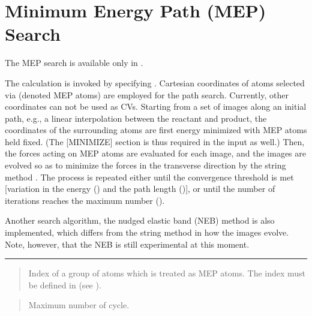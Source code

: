 \documentclass[a4paper,11pt,oneside,english]{sphinxmanual}
\begin{document}
\section{Minimum Energy Path (MEP) Search}
\label{\detokenize{15_RPath:minimum-energy-path-mep-search}}
The MEP search is available only in .

The calculation is invoked by specifying  .
Cartesian coordinates of atoms selected via 
(denoted MEP atoms)  are employed for the path search.
Currently, other coordinates can not be used as CVs.
Starting from a set of images along an initial path, e.g., a linear
interpolation between the reactant and product,
the coordinates of the surrounding atoms are first energy minimized
with MEP atoms held fixed. (The {[}MINIMIZE{]} section is thus
required in the input as well.) Then, the forces
acting on MEP atoms are evaluated for each image, and the
images are evolved so as to minimize the forces in the transverse
direction by the string method .
The process is repeated either until the convergence
threshold is met {[}variation in the energy () and the
path length (){]}, or
until the number of iterations reaches the maximum number ().

Another search algorithm, the nudged elastic band (NEB) method
 is also implemented, which differs from
the string method in how the images evolve.  Note, however, that
the NEB is still experimental at this moment.


\bigskip\hrule\bigskip


 
\begin{quote}

Index of a group of atoms which is treated as MEP atoms.
The index must be defined in \sphinxstylestrong{{[}SELECTION{]}} (see {\hyperref[\detokenize{11_Selection:selection}]{}}).
\end{quote}

 
\begin{quote}


Maximum number of cycle.
\end{quote}
\end{document}
